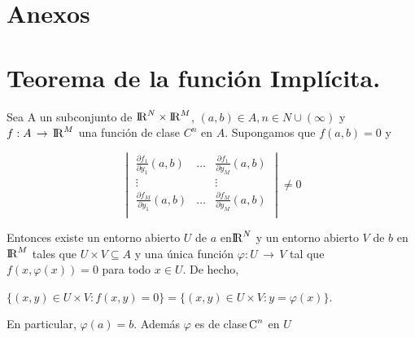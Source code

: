 \documentclass[12pt]{article}
\begin{document}
\clearpage

\section*{Anexos}
\appendix
\section{Teorema de la función Implícita.}
Sea A un subconjunto de  ${\rm I\!R} ^N \times {\rm I\!R} ^M$, $(a,b) \in A, n \in N \cup(\infty)$ y $f: A\,\to\,{\rm I\!R} ^M$ una función de clase $C^n$ en $A$. Supongamos que $f(a,b)=0$ y 

\[
\begin{vmatrix}
\frac{\partial f_{1}}{ \partial y_{1}}(a,b) & \dots & \frac{\partial f_{1}}{ \partial y_{M}}(a,b) \\
\vdots &&\vdots \\
\frac{\partial f_{M}}{ \partial y_{1}}(a,b) &\dots& \frac{\partial f_{M}}{ \partial y_{M}}(a,b) \\
\end{vmatrix}
\neq 0
\]


Entonces existe un entorno abierto $U$ de $a$ en$ {\rm I\!R} ^N$ y un entorno abierto $V$ de $b$ en ${\rm I\!R} ^M$ tales que $U \times V \subseteq A$ y una única función $\varphi: U \,\to\, V$ tal que $f(x,\varphi(x))=0$ para todo $x \in U$. De hecho,\\
\begin{center}
$\{ (x,y)  \in U \times V: f(x,y)=0 \} =\{ (x,y)  \in U \times V: y= \varphi (x) \}$.
\end{center}
En particular, $ \varphi (a)=b$. Además  $\varphi$ es de clase ${\rm \!C} ^n$ en $U$
\clearpage
\end{document}
